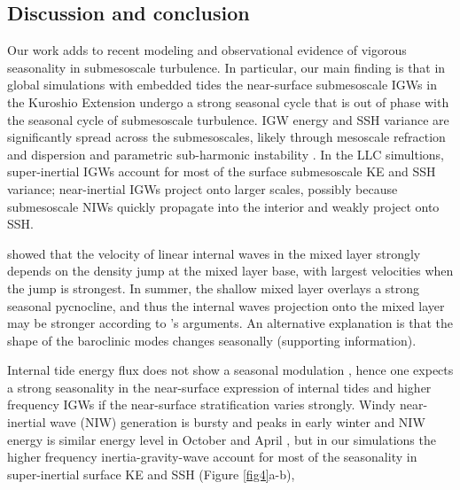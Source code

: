 \documentclass[grl]{agutex2015}
\begin{document}
\begin{article}
\section{Discussion and conclusion}
Our work adds to recent modeling \citep[e.g., ][]{sasaki_etal2014}
and observational \citep[e.g., ][]{callies_etal2015,buckingham_etal2016} evidence of vigorous seasonality in
submesoscale turbulence. In particular, our main finding is that in global simulations with embedded tides the
near-surface submesoscale IGWs in the Kuroshio Extension undergo
a strong seasonal cycle that is out of phase with the seasonal cycle of
submesoscale turbulence. IGW energy and SSH variance are significantly spread across
the submesoscales, likely through mesoscale refraction and dispersion \citep[e.g.,][and references therein]{ponte_klein2015,alford_etal2016}
 and parametric
sub-harmonic instability \citep[e.g., ][]{mackinnon_winters2005}.
In the LLC simultions,
super-inertial IGWs account for most of the surface submesoscale KE and SSH variance;
near-inertial IGWs project onto larger scales, possibly because submesoscale
NIWs quickly propagate into the interior and weakly project onto SSH.


\cite{dasaro1978} showed that the velocity of linear internal waves
in the mixed layer strongly depends on the density jump at the mixed layer
base, with largest velocities when the jump is strongest.
In summer, the shallow mixed layer overlays a strong seasonal pycnocline,
and thus the internal waves projection onto the mixed layer may be stronger
according to \cite{dasaro1978}'s arguments. An
alternative explanation is that the shape of the baroclinic modes
changes seasonally (supporting information).

Internal tide energy flux does not show a seasonal modulation \citep[e.g.,][]{alford2003},
hence one expects a strong seasonality in the near-surface
expression of internal tides and
higher frequency IGWs if the near-surface stratification varies strongly.
Windy near-inertial wave (NIW) generation is bursty and peaks in early winter and
NIW energy is similar energy level in October and April
\citep{alford_etal2016}, but in our simulations the higher frequency inertia-gravity-wave
account for most of the seasonality in super-inertial surface KE and SSH
(Figure \ref{fig4}a-b),


\end{article}
\end{document}
